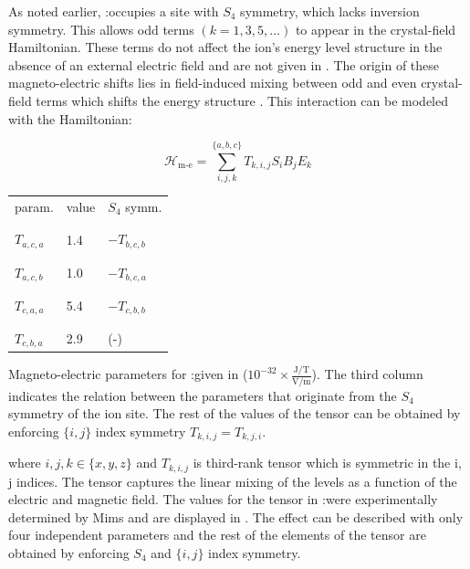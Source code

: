 As noted earlier, \Er:\Ca occupies a site with $S_4$ symmetry, which lacks inversion symmetry. This allows odd terms $(k=1,3,5,\dots)$ to appear in the crystal-field Hamiltonian. These terms do not affect the ion's energy level structure in the absence of an external electric field and are not given in . The origin of these magneto-electric shifts lies in field-induced mixing between odd and even crystal-field terms which shifts the energy structure . This interaction can be modeled with the Hamiltonian:

\begin{equation}
    \mathcal{H}_{\text{m-e}} = \sum_{i,j,k}^{\{a,b,c\}} T_{k, i, j} S_{i} B_j E_k
\end{equation}

\begin{margintable}
\centering
\begin{tabular}{l|l|l}
param.         & value  & $S_4$ symm.   \\[-1em] \\ \hline \\[-1em]
$T_{a,c,a}$    & 1.4    & $-T_{b,c,b}$  \\[-1em] \\ \hline \\[-1em]
$T_{a,c,b}$    & 1.0    & $-T_{b,c,a}$  \\[-1em] \\ \hline \\[-1em]
$T_{c,a,a}$    & 5.4    & $-T_{c,b,b}$  \\[-1em] \\ \hline \\[-1em]
$T_{c,b,a}$    & 2.9    &  (-) 
\end{tabular}
\caption[Magneto-optic parameters]{Magneto-electric parameters for \Er:\Ca given in ($10^{-32} \times \frac{\text{J/T}}{\text{V/m}}$). The third column indicates the relation between the parameters that originate from the $S_4$ symmetry of the ion site. The rest of the values of the tensor can be obtained by enforcing $\{i, j\}$ index symmetry $T_{k, i, j} = T_{k, j, i}$.}
\end{margintable}

where $i,j,k \in\{x,y,z\}$ and $T_{k, i, j}$ is third-rank tensor which is symmetric in the {i, j} indices. The tensor captures the linear mixing of the levels as a function of the electric and magnetic field. The values for the tensor in \Er:\Ca were experimentally determined by Mims  and are displayed in . The effect can be described with only four independent parameters and the rest of the elements of the tensor are obtained by enforcing $S_4$ and $\{i, j\}$ index symmetry.

